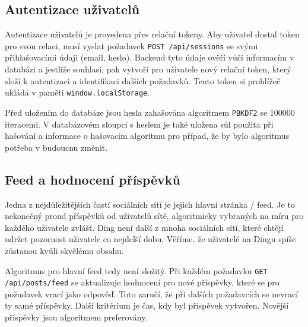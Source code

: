 \subsection{Autentizace uživatelů}

Autentizace uživatelů je provedena přes relační tokeny. Aby uživatel dostal token pro svou relaci,
musí vyslat požadavek \texttt{POST /api/sessions} se svými přihlašovacími údaji (email, heslo).
Backend tyto údaje ověří vůči informacím v databázi a jestliže souhlasí, pak vytvoří pro uživatele
nový relační token, který složí k autentizaci a identifikaci dalších požadavků. Tento token si
prohlížeč ukládá v paměti \texttt{window.localStorage}.

Před uložením do databáze jsou hesla zahašována algoritmem \texttt{PBKDF2} se \num{100 000} iteracemi. V
databázovém sloupci s heslem je také uložena sůl použita při hašování a informace o hašovacím
algoritmu pro případ, že by bylo algoritmus potřeba v budoucnu změnit.

\subsection{Feed a hodnocení příspěvků}

Jedna z nejdůležitějších častí sociálních sítí je jejich hlavní stránka / feed. Je to nekonečný proud
příspěvků od uživatelů sítě, algoritmicky vybraných na míru pro každého uživatele zvlášť. Ding není
další z mnoha sociálních sítí, které chtějí udržet pozornost uživatele co nejdelší dobu. Věříme, že 
uživatelé na Dingu spíše zůstanou kvůli skvělému obsahu.

Algoritmus pro hlavní feed tedy není složitý. Při každém požadavku \texttt{GET /api/posts/feed} se
aktualizuje hodnocení pro nové příspěvky, které se pro požadavek vrací jako odpověď. Toto zaručí, že
při dalších požadavcích se nevrací ty samé příspěvky. Další kritérium je čas, kdy byl příspěvek vytvořen.
Novější příspěvky jsou algoritmem preferovány.